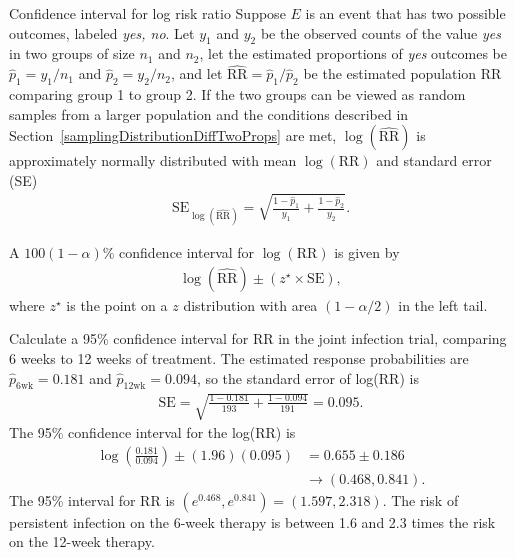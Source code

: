 \begin{onebox}{Confidence interval for log risk ratio}
  Suppose $E$ is an event that has two possible outcomes, labeled \textit{yes, no}. Let $y_1$ and $y_2$ be the observed counts of the value \textit{yes} in two groups of size $n_1$ and $n_2$, let the estimated proportions of \textit{yes} outcomes be $\hat{p}_1 = y_1/n_1$ and $\hat{p}_2 = y_2/n_2$, and let $\widehat{\text{RR}} = \hat{p}_1/\hat{p}_2$ be the estimated population RR comparing group 1 to group 2.  If the two groups can be viewed as random samples from a larger population and the conditions described in Section~\ref{samplingDistributionDiffTwoProps} are met,  $\log(\widehat{\text{RR}})$ is approximately normally distributed with mean  $\log(\text{RR})$ and standard error (SE)
  \begin{align*}
  \text{SE}_{\log(\widehat{\text{RR}})} = \sqrt{\frac{1 - \hat{p}_1}{y_1} + \frac{1 - \hat{p}_2}{y_2}}.
  \end{align*}

  A $100(1  - \alpha)\%$ confidence interval for $\log(\text{RR})$ is given by
\begin{align}
  \log(\widehat{\text{RR}}) \pm (z^{\star} \times \text{SE}),
  \label{eqn:confidenceIntervalRR}
\end{align}
where $z^{\star}$ is the point on a $z$  distribution with area $(1 - \alpha/2)$ in the left tail.
\end{onebox}

\begin{examplewrap}
\begin{nexample}{Calculate a 95\% confidence interval for RR in the joint infection trial, comparing 6 weeks to 12 weeks of treatment.}\label{ex:jointInfectionRRCI}
The estimated response probabilities are $\hat{p}_{\text{6wk}} = 0.181$ and
$\hat{p}_{\text{12wk}} = 0.094$, so the standard error of log(RR) is
\begin{align*}
    \text{SE} = \sqrt{\frac{1 - 0.181}{193} + \frac{1 - 0.094}{191}} = 0.095.
  \end{align*}
The 95\% confidence interval for the log(RR) is
\begin{align*}
\log\left(\frac{0.181}{0.094}\right) \pm (1.96)(0.095) &= 0.655 \pm 0.186\\
&\to (0.468, 0.841).
\end{align*}
The 95\% interval for RR is $(e^{0.468}, e^{0.841}) = (1.597, 2.318)$. The risk of persistent infection on the 6-week therapy is between 1.6 and 2.3 times the risk on the 12-week therapy.
\end{nexample}
\end{examplewrap}

